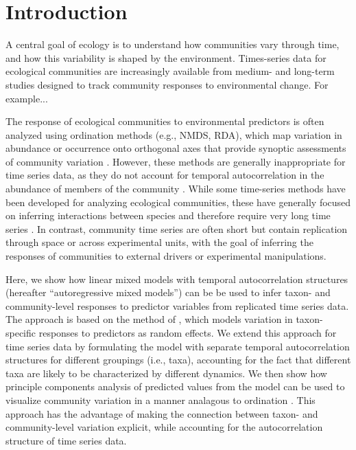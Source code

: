 \section*{Introduction}

A central goal of ecology is to understand how communities vary through time, and
how this variability is shaped by the environment.
Times-series data for ecological communities are increasingly available
from medium- and long-term studies designed to track community responses
to environmental change. For example...

The response of ecological communities to environmental predictors is often analyzed using
ordination methods (e.g., NMDS, RDA),
which map variation in abundance or occurrence onto orthogonal
axes that provide synoptic assessments of community variation \citep{Mcgarigal2013}.
However, these methods are generally inappropriate for time series data,
as they do not account
for temporal autocorrelation in the abundance of members of the community \citep{Ives2006}.
While some time-series methods have been developed for analyzing ecological communities,
these have generally focused on inferring interactions between species and therefore
require very long time series \citep{Ives1999, Hampton2013}.
In contrast, community time series are often short but
contain replication through space or across experimental units, with the goal of inferring
the responses of communities to external drivers or experimental manipulations.

Here, we show how linear mixed models with temporal autocorrelation structures
(hereafter ``autoregressive mixed models'') can be be used to infer taxon- and
community-level responses to predictor variables from replicated time series data. The
approach is based on the method of \cite{Jackson2012},
which models variation in taxon-specific responses to predictors as
random effects.
We extend this approach for time series data by formulating the model with separate
temporal autocorrelation structures for different groupings (i.e., taxa),
accounting for the fact that different taxa are likely to be characterized by
different dynamics. We then show how principle components analysis of predicted values
from the model can be used to visualize
community variation in a manner analagous to ordination
\citep{Jackson2012}.
This approach has the advantage of making the connection between
taxon- and community-level variation explicit, while accounting for the autocorrelation
structure of time series data.

